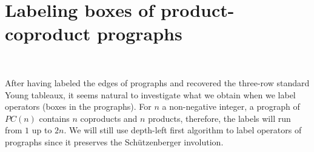 \documentclass{amsart}
\begin{document}
\section{Labeling boxes of product-coproduct prographs}~\label{section_boxes}


After having labeled the edges of prographs and recovered the three-row
standard Young tableaux, it seems natural to investigate what we
obtain when we label operators (boxes in the prographs). For $n$ a
non-negative integer, a prograph of $PC(n)$ contains $n$ coproducts
and $n$ products, therefore, the labels will run from $1$ up to
$2n$. We will still use depth-left first algorithm to label operators
of prographs since it preserves the Schützenberger involution. 
\end{document}

